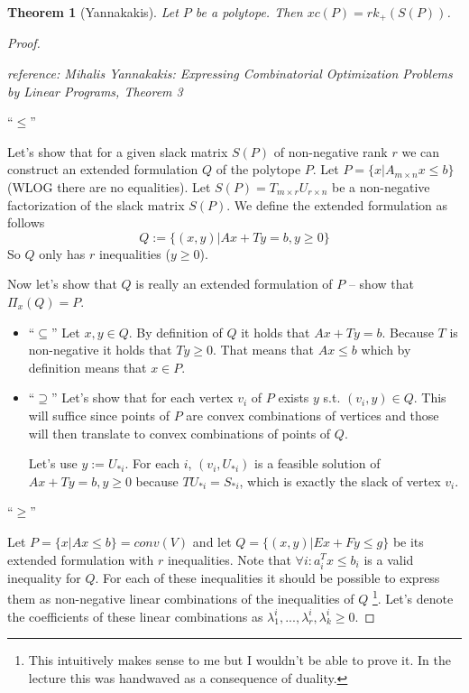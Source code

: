 \documentclass{article}
\newtheorem*{theorem}{Theorem}
\begin{document}
\begin{theorem}[Yannakakis]
	Let $P$ be a polytope. Then $xc(P) = rk_+(S(P))$.
\end{theorem}
\begin{proof}
	~

	\emph{reference: Mihalis Yannakakis: Expressing Combinatorial
	Optimization Problems by Linear Programs, Theorem 3}

	\noindent
	\enquote{$\le$}

	Let's show that for a given slack matrix $S(P)$ of non-negative rank
	$r$ we can construct an extended formulation $Q$ of the polytope $P$.
	Let $P = \{ x | A_{m \times n}x \le b\}$ (WLOG there are no
	equalities). Let $S(P) = T_{m \times r}U_{r \times n}$ be a
	non-negative factorization of the slack matrix $S(P)$. We define the
	extended formulation as follows
	$$
	Q := \{(x,y) | Ax + Ty = b, y \ge 0\}
	$$
	So $Q$ only has $r$ inequalities ($y \ge 0$).

	Now let's show that $Q$ is really an extended formulation of $P$ --
	show that $\Pi_x (Q) = P$.

	\begin{itemize}
		\item \enquote{$\subseteq$}
			Let $x,y \in Q$. By definition of $Q$ it holds that $Ax
			+ Ty = b$. Because $T$ is non-negative it holds that
			$Ty \ge 0$. That means that $Ax \le b$ which by
			definition means that $x \in P$.
		\item \enquote{$\supseteq$}
			Let's show that for each vertex $v_i$ of $P$ exists $y$
			s.t. $(v_i,y) \in Q$. This will suffice since points of
			$P$ are convex combinations of vertices and those
			will then translate to convex combinations of points of
			$Q$.

			Let's use $y := U_{*i}$. For each $i$, $(v_i, U_{*i})$
			is a feasible solution of $Ax + Ty = b, y \ge 0$
			because $TU_{*i} = S_{*i}$, which is exactly the slack
			of vertex $v_i$.
	\end{itemize}

	\noindent
	\enquote{$\ge$}

	Let $P = \{ x | Ax \le b \} = conv(V)$ and let $Q = \{(x,y) | Ex + Fy
	\le g\}$ be its extended formulation with $r$ inequalities. Note that
	$\forall i: a_i^Tx \le b_i$ is a valid inequality for $Q$. For each of
	these inequalities it should be possible to express them as
	non-negative linear combinations of the inequalities of $Q$
	\footnote{This intuitively makes sense to me but I wouldn't be able to
	prove it. In the lecture this was handwaved as a consequence of
	duality.}. Let's denote the coefficients of these linear combinations
	as
	$\lambda_1^i,...,\lambda_r^i, \lambda_k^i \ge 0$.


\end{proof}
\end{document}
